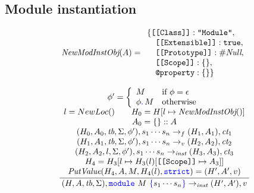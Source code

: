 \documentclass[a4paper]{article}
\newcommand{\code}[1]{\textcolor{blue}{\tt #1}}
\newcommand{\mydot}{.\,}
\newcommand{\dom}{\mathop{\mathrm{Dom}}}
\newcommand{\Unprefix}{\emph{Unprefix}}
\newcommand{\NewModInstObj}{\emph{NewModInstObj}}
\newcommand{\If}{\mbox{if}}
\newcommand{\Otherwise}{\mbox{otherwise}}
\newcommand{\tb}{\emph{tb}}
\newcommand{\ct}{\emph{ct}}
\newcommand{\ap}{\emph{ap}}
\begin{document}
\subsection{Module instantiation}

\begin{equation*}
\NewModInstObj(A) = \begin{array}{l}
\{ \texttt{[[Class]]}: \texttt{"Module"}, \\
\quad \texttt{[[Extensible]]}: \texttt{true}, \\
\quad \texttt{[[Prototype]]}: \#\emph{Null}, \\
\quad \texttt{[[Scope]]}: \{\}, \\
\quad \texttt{@property}: \{\} \}
\end{array}
\end{equation*}

\begin{equation*}
\frac{
    \begin{array}{c}
    \phi' = \left\{\begin{array}{ll}
        M & \If\ \phi = \epsilon \\
        \phi\code{\mydot}M & \Otherwise
    \end{array}\right. \\
    l = NewLoc() \qquad H_0 = H [l \mapsto \NewModInstObj()] \\
    A_0 = \{\} :: A \\
    (H_0, A_0, \tb, \Sigma, \phi'), s_1 \cdots s_n \rightarrow_f (H_1, A_1), \ct_1 \\
    (H_1, A_1, \tb, \Sigma, \phi'), s_1 \cdots s_n \rightarrow_v (H_2, A_2), \ct_2 \\
    (H_2, A_2, l, \Sigma, \phi'), s_1 \cdots s_n \rightarrow_\emph{inst} (H_3, A_3), \ct_3 \\
    H_4 = H_3[l \mapsto H_3(l)[\texttt{[[Scope]]} \mapsto A_3]] \\
    \emph{PutValue}(H_4, A, M, H_4(l), \code{strict}) = (H', A', v)

    \end{array}
}{
    (H, A, \tb, \Sigma), \code{module}\ M\ \code{\{} s_1 \cdots s_n \code{\}} \rightarrow_\emph{inst} (H', A'), v
}
\end{equation*}
\end{document}
